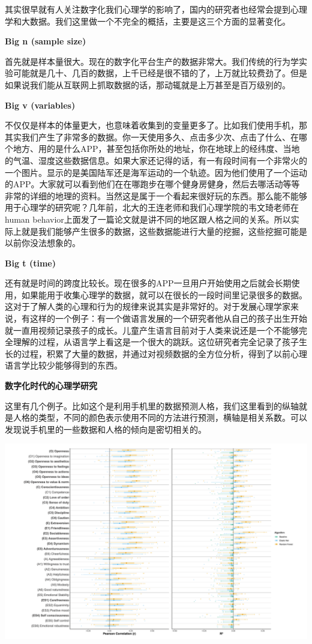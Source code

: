 \documentclass[
  oneside]{book}
\begin{document}
其实很早就有人关注数字化我们心理学的影响了，国内的研究者也经常会提到心理学和大数据。我们这里做一个不完全的概括，主要是这三个方面的显著变化。

\textbf{Big n (sample size)}

首先就是样本量很大。现在的数字化平台生产的数据非常大。我们传统的行为学实验可能就是几十、几百的数据，上千已经是很不错的了，上万就比较费劲了。但是如果说我们能从互联网上抓取数据的话，那动辄就是上万甚至是百万级别的。

\textbf{Big v (variables)}

不仅仅是样本的体量更大，也意味着收集到的变量更多了。比如我们使用手机，那其实我们产生了非常多的数据。你一天使用多久、点击多少次、点击了什么、在哪个地方、用的是什么APP，甚至包括你所处的地址，你在地球上的经纬度、当地的气温、湿度这些数据信息。如果大家还记得的话，有一有段时间有一个非常火的一个图片。显示的是美国陆军还是海军运动的一个轨迹。因为他们使用了一个运动的APP。大家就可以看到他们在在哪跑步在哪个健身房健身，然后去哪活动等等非常的详细的地理的资料。当然这是属于一个看起来很好玩的东西。那么能不能够用于心理学的研究呢？几年前，北大的王连老师和我们心理学院的韦文琦老师在human behavior上面发了一篇论文就是讲不同的地区跟人格之间的关系。所以实际上就是我们能够产生很多的数据，这些数据能进行大量的挖掘，这些挖掘可能是以前你没法想象的。

\textbf{Big t (time)}

还有就是时间的跨度比较长。现在很多的APP一旦用户开始使用之后就会长期使用，如果能用于收集心理学的数据，就可以在很长的一段时间里记录很多的数据。这对于了解人类的心理和行为的规律来说其实是非常好的。对于发展心理学家来说，有这样的一个例子：有一个做语言发展的一个研究者他从自己的孩子出生开始就一直用视频记录孩子的成长。儿童产生语言目前对于人类来说还是一个不能够完全理解的过程，从语言学上看这是一个很大的跳跃。这位研究者完全记录了孩子生长的过程，积累了大量的数据，并通过对视频数据的全方位分析，得到了以前心理语言学比较少能够得到的东西。

\textbf{数字化时代的心理学研究}

这里有几个例子。比如这个是利用手机里的数据预测人格，我们这里看到的纵轴就是人格的类型，不同的颜色表示使用不同的方法进行预测，横轴是相关系数。可以发现说手机里的一些数据和人格的倾向是密切相关的。

\includegraphics{1001-lesson1/image-20230302195218412.png}
\end{document}
